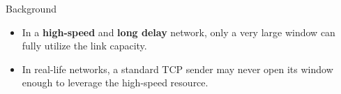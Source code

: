 \begin{frame}{Background}
	\begin{itemize}
	    \item In a \textbf{high-speed} and
		  \textbf{long delay} network, only a
		  very large window can fully utilize the link capacity.
	    \item In real-life networks, a
		  standard TCP sender may never open its window enough
		  to leverage the high-speed resource.
	\end{itemize}
\end{frame}
